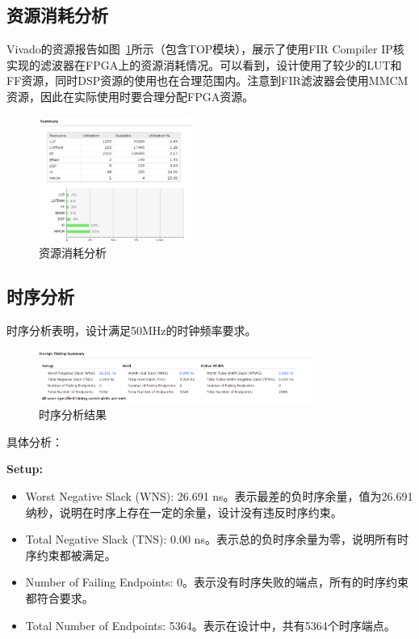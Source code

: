 \subsection{资源消耗分析}
Vivado的资源报告如图~\ref{fig:exp7:resource_analysis}所示（包含TOP模块），展示了使用FIR Compiler IP核实现的滤波器在FPGA上的资源消耗情况。可以看到，设计使用了较少的LUT和FF资源，同时DSP资源的使用也在合理范围内。注意到FIR滤波器会使用MMCM资源，因此在实际使用时要合理分配FPGA资源。

\begin{figure}[htbp]
    \centering
    \includegraphics[width=0.45\textwidth]{figure/exp7/util_summary.png}
    \caption{资源消耗分析}
    \label{fig:exp7:resource_analysis}
\end{figure}
\subsection{时序分析}

时序分析表明，设计满足50MHz的时钟频率要求。
\begin{figure}[htbp]
    \centering
    \includegraphics[width=0.8\textwidth]{figure/exp7/timing_summary.png}
    \caption{时序分析结果}
    \label{fig:exp7:time_analysis}
\end{figure}

具体分析：

\textbf{Setup:}  
\begin{itemize}
  \item Worst Negative Slack (WNS): 26.691 ns。表示最差的负时序余量，值为26.691纳秒，说明在时序上存在一定的余量，设计没有违反时序约束。  
\item Total Negative Slack (TNS): 0.00 ns。表示总的负时序余量为零，说明所有时序约束都被满足。  
\item Number of Failing Endpoints: 0。表示没有时序失败的端点，所有的时序约束都符合要求。  
\item Total Number of Endpoints: 5364。表示在设计中，共有5364个时序端点。
\end{itemize}


